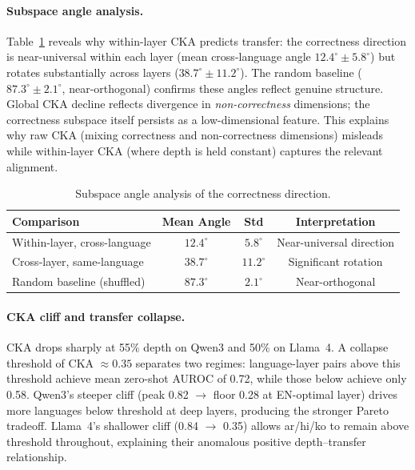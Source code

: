 \documentclass[11pt,a4paper]{article}
\begin{document}
\paragraph{Subspace angle analysis.}
Table~\ref{tab:subspace} reveals why within-layer CKA predicts transfer: the correctness direction is near-universal within each layer (mean cross-language angle $12.4^{\circ} \pm 5.8^{\circ}$) but rotates substantially across layers ($38.7^{\circ} \pm 11.2^{\circ}$). The random baseline ($87.3^{\circ} \pm 2.1^{\circ}$, near-orthogonal) confirms these angles reflect genuine structure. Global CKA decline reflects divergence in \emph{non-correctness} dimensions; the correctness subspace itself persists as a low-dimensional feature. This explains why raw CKA (mixing correctness and non-correctness dimensions) misleads while within-layer CKA (where depth is held constant) captures the relevant alignment.

\begin{table}[t]
\centering
\caption{Subspace angle analysis of the correctness direction.}
\label{tab:subspace}
\small
\begin{tabular}{lccc}
\toprule
Comparison & Mean Angle & Std & Interpretation \\
\midrule
Within-layer, cross-language & $12.4^{\circ}$ & $5.8^{\circ}$ & Near-universal direction \\
Cross-layer, same-language   & $38.7^{\circ}$ & $11.2^{\circ}$ & Significant rotation \\
Random baseline (shuffled)   & $87.3^{\circ}$ & $2.1^{\circ}$ & Near-orthogonal \\
\bottomrule
\end{tabular}
\end{table}

\paragraph{CKA cliff and transfer collapse.}
CKA drops sharply at 55\% depth on Qwen3 and 50\% on Llama~4. A collapse threshold of CKA $\approx 0.35$ separates two regimes: language-layer pairs above this threshold achieve mean zero-shot AUROC of 0.72, while those below achieve only 0.58. Qwen3's steeper cliff (peak 0.82 $\to$ floor 0.28 at EN-optimal layer) drives more languages below threshold at deep layers, producing the stronger Pareto tradeoff. Llama~4's shallower cliff (0.84 $\to$ 0.35) allows ar/hi/ko to remain above threshold throughout, explaining their anomalous positive depth--transfer relationship.
\end{document}
